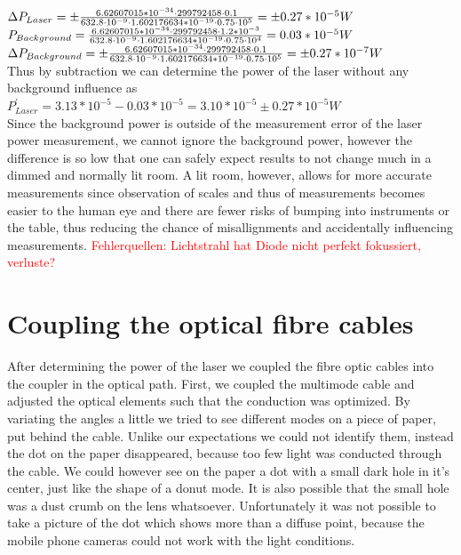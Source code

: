 \documentclass{article}
\begin{document}
$\Delta P_{Laser}= \pm \frac{6.62607015*10^{-34}\cdot299792458\cdot0.1}{632.8\cdot10^{-9}\cdot1.602176634*10^{-19}\cdot0.75\cdot10^{5}} =\pm 0.27*10^{-5} W\vspace{2cm}$\\

$P_{Background} =  \frac{6.62607015*10^{-34}\cdot299792458\cdot1.2*10^{-3}}{632.8\cdot10^{-9}\cdot1.602176634*10^{-19}\cdot0.75\cdot10^{4}}=0.03*10^{-5}W \vspace{2cm}$\\

$\Delta P_{Background} = \pm \frac{6.62607015*10^{-34}\cdot299792458\cdot0.1}{632.8\cdot10^{-9}\cdot1.602176634*10^{-19}\cdot0.75\cdot10^{5}} =\pm 0.27*10^{-7}W \vspace{2cm}$\\

Thus by subtraction we can determine the power of the laser without any background influence as\\

$P^{'}_{Laser} = 3.13*10^{-5}- 0.03*10^{-5} =3.10*10^{-5} \pm 0.27*10^{-5}W$\\

Since the background power is outside of the measurement error of
the laser power measurement, we cannot ignore the background power, however the difference is so low that one can safely expect results to not change much in a dimmed and normally lit room. A lit room, however, allows for more accurate measurements since observation of scales and thus of measurements becomes easier to the human eye and there are fewer risks of bumping into instruments or the table, thus reducing the chance of misallignments and accidentally influencing measurements.
\textcolor{red}{Fehlerquellen: Lichtstrahl hat Diode nicht perfekt fokussiert, verluste?}

\section{Coupling the optical fibre cables}

After determining the power of the laser we coupled the fibre optic cables into the coupler in the optical path. First, we coupled the multimode cable and adjusted the optical elements such that the conduction was optimized. By variating the angles a little we tried to see different modes on a piece of paper, put behind the cable. Unlike our expectations we could not identify them, instead the dot on the paper disappeared, because too few light was conducted through the cable. We could however see on the paper a dot with a small dark hole in it's center, just like the shape of a donut mode. It is also possible that the small hole was a dust crumb on the lens whatsoever. Unfortunately it was not possible to take a picture of the dot which shows more than a diffuse point, because the mobile phone cameras could not work with the light conditions.\\
\end{document}
